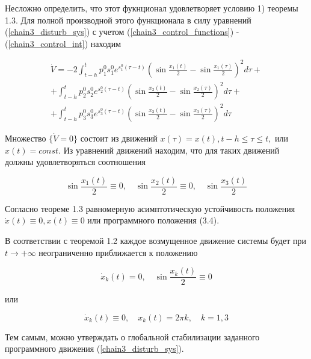   Несложно определить, что этот фукнционал удовлетворяет условию 1) теоремы 1.3. Для полной производной этого функционала в силу уравнений (\ref{chain3_disturb_sys}) с учетом (\ref{chain3_control_functions}) - (\ref{chain3_control_int}) находим
  
    \begin{equation*}
    \begin{array}{l}
	\displaystyle \dot V = - 2 \int_{t - h}^{t} p_1^0 s_1^0 e^{s_1^0 (\tau - t)} \left( \sin \frac{x_1(t)}{2} - \sin \frac{x_1(\tau)}{2} \right)^2 d \tau + \\
	\displaystyle + \int_{t - h}^{t} p_2^0 s_2^0 e^{s_2^0 (\tau - t)} \left( \sin \frac{x_2(t)}{2} - \sin \frac{x_2(\tau)}{2} \right)^2 d \tau + \\ 
	\displaystyle + \int_{t - h}^{t} p_3^0 s_3^0 e^{s_3^0 (\tau - t)} \left( \sin \frac{x_3(t)}{2} - \sin \frac{x_3(\tau)}{2} \right)^2 d \tau
    \end{array}
    \end{equation*}
  
  
  Множество $\lbrace \dot V = 0 \rbrace$ состоит из движений $x(\tau) = x(t), t - h \le \tau \le t,$ или $x(t) = const.$ Из уравнений движений находим, что для таких движений должны удовлетворяться соотношения 
  
  \begin{equation*}
	\sin \frac{x_1(t)}{2} \equiv 0, \quad \sin \frac{x_2(t)}{2} \equiv 0, \quad \sin \frac{x_3(t)}{2}
  \end{equation*}
  
  Согласно теореме 1.3 равномерную асимптотическую устойчивость положения $\dot x(t) \equiv 0, x(t) \equiv 0$ или программного положения (3.4).
  
  В соответствии с теоремой 1.2 каждое возмущенное движение системы будет при $t \to + \infty$ неограниченно приближается к положению
  
  \begin{equation*}
  \dot x_k(t) = 0, \quad \sin \frac{x_k(t)}{2} \equiv 0
  \end{equation*}
  
  или
  
  \begin{equation*}
  \dot x_k (t) \equiv 0, \quad x_k(t) = 2 \pi k, \quad k = 1, 3
  \end{equation*} 
  
  Тем самым, можно утверждать о глобальной стабилизации заданного программного движения (\ref{chain3_disturb_sys}).
  
